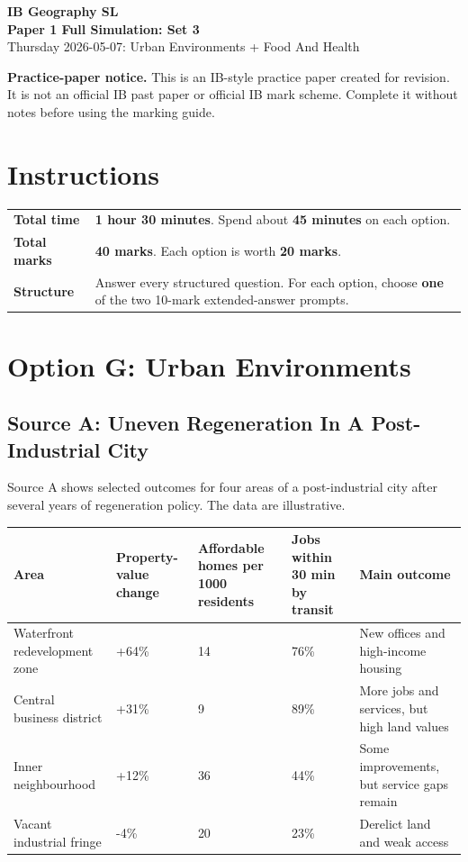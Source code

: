 \documentclass[11pt,a4paper]{article}
\newcommand{\term}[1]{\textcolor{HeadingBlue}{\textbf{#1}}}
\newcommand{\boxnote}[3]{%
\noindent\colorbox{#1}{%
  \begin{minipage}{0.965\textwidth}
  \sffamily
  \textbf{\textcolor{HeadingBlue}{#2}} #3
  \end{minipage}
}}
\begin{document}
\begin{center}
  {\sffamily\bfseries\color{HeadingBlue}\LARGE IB Geography SL}\\[0.2em]
  {\sffamily\bfseries\color{AccentTeal}\Large Paper 1 Full Simulation: Set 3}\\[0.3em]
  {\sffamily\color{TextInk}Thursday 2026-05-07: Urban Environments + Food And Health}
\end{center}

\boxnote{SoftRed}{Practice-paper notice.}{This is an IB-style practice paper
created for revision. It is not an official IB past paper or official IB mark
scheme. Complete it without notes before using the marking guide.}

\section{Instructions}

\begin{tabularx}{\textwidth}{L{0.25\textwidth}Y}
\toprule
\textbf{Total time} & \term{1 hour 30 minutes}. Spend about \term{45 minutes}
on each option. \\
\textbf{Total marks} & \term{40 marks}. Each option is worth \term{20 marks}. \\
\textbf{Structure} & Answer every structured question. For each option, choose
\term{one} of the two 10-mark extended-answer prompts. \\
\bottomrule
\end{tabularx}

\newpage

\section{Option G: Urban Environments}

\subsection{Source A: Uneven Regeneration In A Post-Industrial City}

Source A shows selected outcomes for four areas of a post-industrial city after
several years of regeneration policy. The data are illustrative.

\begin{tabularx}{\textwidth}{L{0.24\textwidth}C{0.15\textwidth}C{0.15\textwidth}C{0.15\textwidth}Y}
\toprule
\textbf{Area} & \textbf{Property-value change} & \textbf{Affordable homes per
1000 residents} & \textbf{Jobs within 30 min by transit} & \textbf{Main outcome} \\
\midrule
Waterfront redevelopment zone & +64\% & 14 & 76\% & New offices and
high-income housing \\
Central business district & +31\% & 9 & 89\% & More jobs and services, but
high land values \\
Inner neighbourhood & +12\% & 36 & 44\% & Some improvements, but service gaps
remain \\
Vacant industrial fringe & -4\% & 20 & 23\% & Derelict land and weak access \\
\bottomrule
\end{tabularx}
\end{document}
